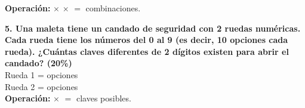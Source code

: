 \documentclass[12pt, letterpaper]{article}
\begin{document}
	\vspace{0.2cm}
	\noindent \textbf{Operación:} \underline{\hspace{1cm}} $\times$ \underline{\hspace{1cm}} $\times$ \underline{\hspace{1cm}} $=$ \underline{\hspace{1cm}} combinaciones.
	\vspace{0.8cm}
	
	\noindent \textbf{5. Una maleta tiene un candado de seguridad con 2 ruedas numéricas. Cada rueda tiene los números del 0 al 9 (es decir, 10 opciones cada rueda). ¿Cuántas claves diferentes de 2 dígitos existen para abrir el candado? (20\%)} \\
	
	
	\vspace{0.3cm}
	\noindent Rueda 1 = \underline{\hspace{1cm}} opciones \\
	\noindent Rueda 2 = \underline{\hspace{1cm}} opciones \\
	
	\vspace{0.2cm}
	\noindent \textbf{Operación:} \underline{\hspace{1cm}} $\times$ \underline{\hspace{1cm}} $=$ \underline{\hspace{1cm}} claves posibles.
	
\end{document}
